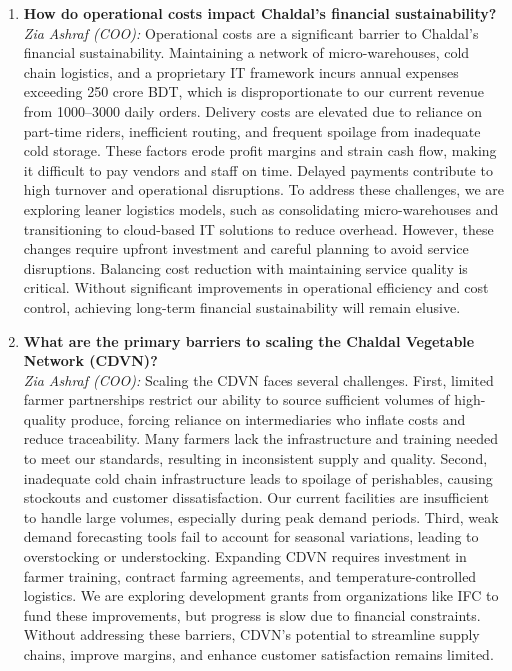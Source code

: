\documentclass[12pt,a4paper]{article}
\begin{document}
\begin{enumerate}
    \item \textbf{How do operational costs impact Chaldal’s financial sustainability?} \\
    \textit{Zia Ashraf (COO):} Operational costs are a significant barrier to Chaldal’s financial sustainability. Maintaining a network of micro-warehouses, cold chain logistics, and a proprietary IT framework incurs annual expenses exceeding 250 crore BDT, which is disproportionate to our current revenue from 1000–3000 daily orders. Delivery costs are elevated due to reliance on part-time riders, inefficient routing, and frequent spoilage from inadequate cold storage. These factors erode profit margins and strain cash flow, making it difficult to pay vendors and staff on time. Delayed payments contribute to high turnover and operational disruptions. To address these challenges, we are exploring leaner logistics models, such as consolidating micro-warehouses and transitioning to cloud-based IT solutions to reduce overhead. However, these changes require upfront investment and careful planning to avoid service disruptions. Balancing cost reduction with maintaining service quality is critical. Without significant improvements in operational efficiency and cost control, achieving long-term financial sustainability will remain elusive.

    \item \textbf{What are the primary barriers to scaling the Chaldal Vegetable Network (CDVN)?} \\
    \textit{Zia Ashraf (COO):} Scaling the CDVN faces several challenges. First, limited farmer partnerships restrict our ability to source sufficient volumes of high-quality produce, forcing reliance on intermediaries who inflate costs and reduce traceability. Many farmers lack the infrastructure and training needed to meet our standards, resulting in inconsistent supply and quality. Second, inadequate cold chain infrastructure leads to spoilage of perishables, causing stockouts and customer dissatisfaction. Our current facilities are insufficient to handle large volumes, especially during peak demand periods. Third, weak demand forecasting tools fail to account for seasonal variations, leading to overstocking or understocking. Expanding CDVN requires investment in farmer training, contract farming agreements, and temperature-controlled logistics. We are exploring development grants from organizations like IFC to fund these improvements, but progress is slow due to financial constraints. Without addressing these barriers, CDVN’s potential to streamline supply chains, improve margins, and enhance customer satisfaction remains limited.


\end{enumerate}
\end{document}
